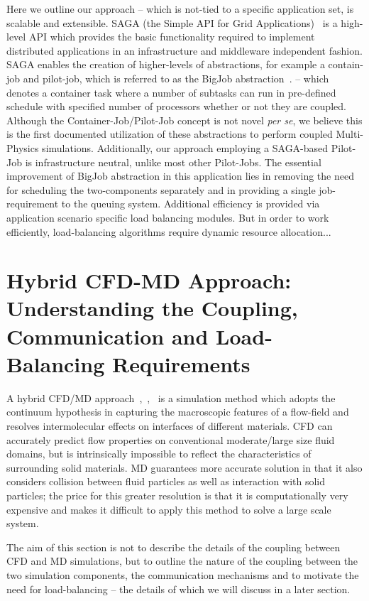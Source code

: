 \documentclass[conference,final]{IEEEtran}
\begin{document}
Here we outline our approach -- which is not-tied to a specific application set, is scalable and extensible. SAGA (the Simple API for Grid Applications)~\cite{saga_web}  is a high-level API which provides the basic functionality required to implement distributed applications in an infrastructure and middleware independent fashion.  SAGA enables the creation of higher-levels of abstractions, for example a contain-job and pilot-job, which is referred to as the BigJob abstraction~\cite{saga_royalsoc}.  -- which denotes a container task where a number of subtasks can run in pre-defined schedule with specified number of processors whether or not they are coupled.  Although the Container-Job/Pilot-Job concept is not novel {\it per se}, we believe this is the first documented utilization of these abstractions to perform coupled Multi-Physics simulations. Additionally, our approach employing a SAGA-based Pilot-Job is infrastructure neutral, unlike most other Pilot-Jobs.  The essential improvement of BigJob abstraction in this application lies in removing the need for scheduling the two-components separately and in providing a single job-requirement to the queuing system. Additional efficiency is provided via application scenario specific load balancing modules. But in order to work efficiently, load-balancing algorithms require dynamic resource allocation...

\section{Hybrid CFD-MD Approach: Understanding the Coupling, Communication and Load-Balancing Requirements}

A hybrid CFD/MD approach~\cite{Thompson},~\cite{Nie},~\cite{Yen} is a simulation method which adopts the continuum hypothesis in capturing the macroscopic features of a flow-field and resolves intermolecular effects on interfaces of different materials. CFD can accurately predict flow properties on conventional moderate/large size fluid domains, but is intrinsically impossible to reflect the characteristics of surrounding solid materials. MD guarantees more accurate solution in that it also considers collision between fluid particles as well as interaction with solid particles; the price for this greater resolution is that it is computationally very expensive and makes it difficult to apply this method to solve a large scale system.

The aim of this section is not to describe the details of the coupling between CFD and MD simulations, but to outline the nature of the coupling between the two simulation components, the communication mechanisms and to motivate the need for load-balancing -- the details of which we will discuss in a later section. 
\end{document}
